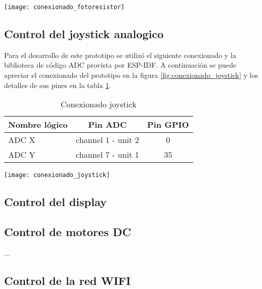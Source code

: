 \vspace{0.5cm}
\begin{center}
  \texttt{[image: conexionado\_fotoresistor]}
    \label{fig:conexionado_fotoresistor}
    
\end{center}
\subsection{Control del joystick analogico}
Para el desarrollo de este prototipo se utilizó el siguiente conexionado y la biblioteca de código ADC provista por ESP-IDF. A continuación se puede apreciar el conexionado del prototipo en la figura \ref{fig:conexionado_joystick} y los detalles de sus pines en la tabla \ref{tab:conexionado_joystick}.


\vspace{0.5cm}
\begin{table}[h]
\centering
\caption[Conexionado joystick]{Conexionado joystick}
\begin{tabular}{l c c}
\toprule
\textbf{Nombre lógico} & \textbf{Pin ADC} & \textbf{Pin GPIO}\\
\midrule
ADC X & channel 1 - unit 2 & 0 \\
ADC Y & channel 7 - unit 1 & 35 \\
\bottomrule
\hline
\end{tabular}
\label{tab:conexionado_joystick}
\end{table}

\vspace{0.5cm}

\begin{center}
  \texttt{[image: conexionado\_joystick]}
    \label{fig:conexionado_joystick}
    

\end{center}

\subsection{Control del display}
 

\subsection{Control de motores DC}


...

\subsection{Control de la red WIFI}


